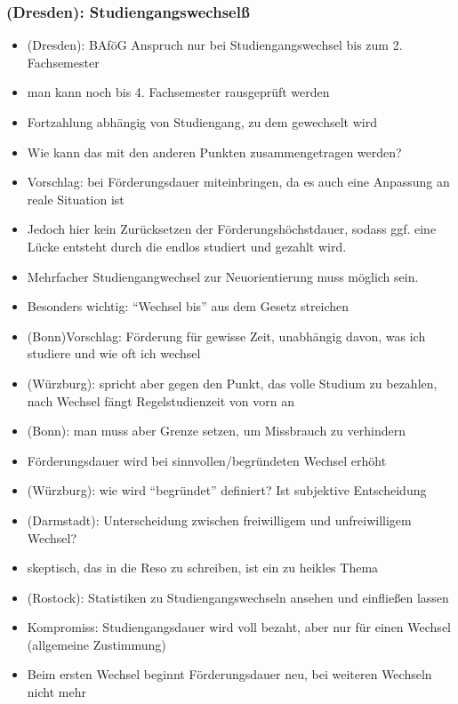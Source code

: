     \subsubsection{(Dresden): Studiengangswechselß}
      \begin{itemize}
        \item (Dresden): BAföG Anspruch nur bei Studiengangswechsel bis zum 2. Fachsemester
        \item man kann noch bis 4. Fachsemester rausgeprüft werden
        \item Fortzahlung abhängig von Studiengang, zu dem gewechselt wird
        \item Wie kann das mit den anderen Punkten zusammengetragen werden?
        \item Vorschlag: bei Förderungsdauer miteinbringen, da es auch eine Anpassung an reale Situation ist
        \item Jedoch hier kein Zurücksetzen der Förderungshöchstdauer, sodass ggf. eine Lücke entsteht durch die endlos studiert und gezahlt wird.
        \item Mehrfacher Studiengangwechsel zur Neuorientierung muss möglich sein.
        \item Besonders wichtig: “Wechsel bis” aus dem Gesetz streichen
        \item (Bonn)Vorschlag: Förderung für gewisse Zeit, unabhängig davon, was ich studiere und wie oft ich wechsel
        \item (Würzburg): spricht aber gegen den Punkt, das volle Studium zu bezahlen, nach Wechsel fängt Regelstudienzeit von vorn an
        \item (Bonn): man muss aber Grenze setzen, um Missbrauch zu verhindern
        \item Förderungsdauer wird bei sinnvollen/begründeten Wechsel erhöht
        \item (Würzburg): wie wird “begründet” definiert? Ist subjektive Entscheidung
        \item (Darmstadt): Unterscheidung zwischen freiwilligem und unfreiwilligem Wechsel?
        \item skeptisch, das in die Reso zu schreiben, ist ein zu heikles Thema
        \item (Rostock): Statistiken zu Studiengangswechseln ansehen und einfließen lassen
        \item Kompromiss: Studiengangsdauer wird voll bezaht, aber nur für einen Wechsel (allgemeine Zustimmung)
        \item Beim ersten Wechsel beginnt Förderungsdauer neu, bei weiteren Wechseln nicht mehr

\end{itemize}
